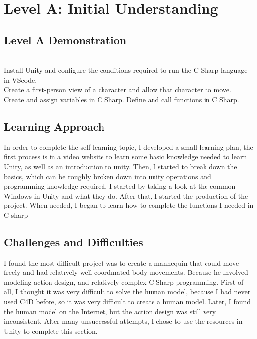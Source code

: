 \documentclass[a4paper, 11pt]{report}
\begin{document}
\tableofcontents







\newpage
\section{Level A: Initial Understanding}
\vspace{5mm}
\subsection{Level A Demonstration}\\
Install Unity and configure the conditions required to run the C Sharp language in VScode.\\
Create a first-person view of a character and allow that character to move.\\
Create and assign variables in C Sharp. Define and call functions in C Sharp.\\



\subsection{Learning Approach}
In order to complete the self learning topic, I developed a small learning plan, the first process is in a video website to learn some basic knowledge needed to learn Unity, as well as an introduction to unity. Then, I started to break down the basics, which can be roughly broken down into unity operations and programming knowledge required.
I started by taking a look at the common Windows in Unity and what they do. After that, I started the production of the project. When needed, I began to learn how to complete the functions I needed in C sharp


\subsection{Challenges and Difficulties}
I found the most difficult project was to create a mannequin that could move freely and had relatively well-coordinated body movements. Because he involved modeling action design, and relatively complex C Sharp programming. First of all, I thought it was very difficult to solve the human model, because I had never used C4D before, so it was very difficult to create a human model. Later, I found the human model on the Internet, but the action design was still very inconsistent. After many unsuccessful attempts, I chose to use the resources in Unity to complete this section.
\end{document}
